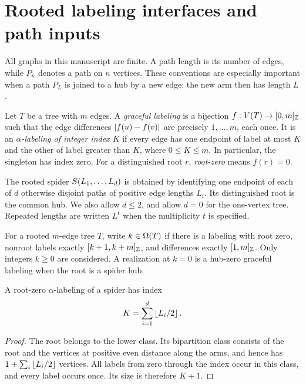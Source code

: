\section{Rooted labeling interfaces and path inputs}
\label{common:foundations}

All graphs in this manuscript are finite. A path length is its number
of edges, while $P_n$ denotes a path on $n$ vertices. These conventions
are especially important when a path $P_L$ is joined to a hub by a new
edge: the new arm then has length $L$.

\begin{definition}
Let $T$ be a tree with $m$ edges. A \emph{graceful labeling} is a
bijection $f:V(T)\to[0,m]_{\mathbb Z}$ such that the edge differences
$\left|f(u)-f(v)\right|$ are precisely $1,\ldots,m$, each once. It is an
\emph{$\alpha$-labeling of integer index $K$} if every edge has one endpoint
of label at most $K$ and the other of label greater than $K$,
where $0\le K\le m$. In particular, the singleton has index zero.
For a distinguished root $r$, \emph{root-zero} means $f(r)=0$.
\end{definition}

The rooted spider $S\!\left(L_1,\ldots,L_d\right)$ is obtained by identifying
one endpoint of each of $d$ otherwise disjoint paths of positive edge
lengths $L_i$. Its distinguished root is the common hub. We also allow
$d\le2$, and allow $d=0$ for the one-vertex tree. Repeated lengths are
written $L^t$ when the multiplicity $t$ is specified.

\begin{definition}
For a rooted $m$-edge tree $T$, write $k\in\Omega(T)$ if there is a
labeling with root zero, nonroot labels exactly
$[k+1,k+m]_{\mathbb Z}$, and differences exactly $[1,m]_{\mathbb Z}$.
Only integers $k\ge0$ are considered. A realization at $k=0$ is a
hub-zero graceful labeling when the root is a spider hub.
\end{definition}

\begin{lemma}\label{common:root-index}
A root-zero $\alpha$-labeling of a spider has index
\[
 K=\sum_{i=1}^d\left\lfloor L_i/2\right\rfloor.
\]
\end{lemma}
\begin{proof}
The root belongs to the lower class. Its bipartition class consists of
the root and the vertices at positive even distance along the arms,
and hence has $1+\sum_i\left\lfloor L_i/2\right\rfloor$ vertices. All labels from zero
through the index occur in this class, and every label occurs once.
Its size is therefore $K+1$.
\end{proof}


